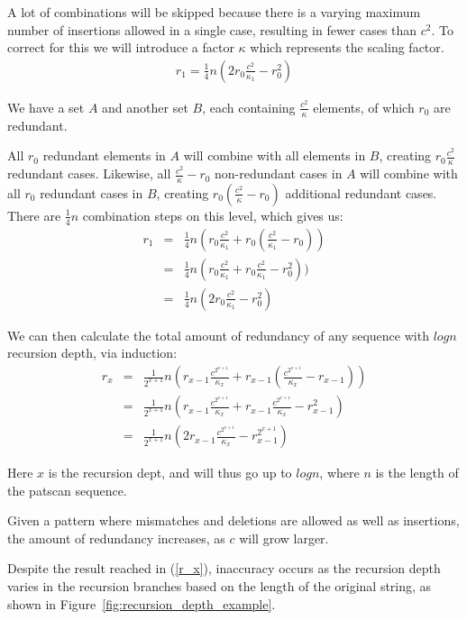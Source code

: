 \documentclass[12pt]{article}
\theoremstyle{definition}
\begin{document}
A lot of combinations will be skipped because there is a varying maximum number of insertions allowed in a single case, resulting in fewer cases than $c^2$. To correct for this we will introduce a factor $\kappa$ which represents the scaling factor.
\begin{eqnarray}
	\label{r_1}
	r_1 = \frac{1}{4}n(2r_0\frac{c^2}{\kappa_1} - r_0^2)
\end{eqnarray}

\begin{example}
We have a set $A$ and another set $B$, each containing $\frac{c^2}{\kappa}$ elements, of which $r_0$ are redundant.

All $r_0$ redundant elements in $A$ will combine with all elements in $B$, creating $r_0\frac{c^2}{\kappa}$ redundant cases. Likewise, all $\frac{c^2}{\kappa}-r_0$ non-redundant cases in $A$ will combine with all $r_0$ redundant cases in $B$, creating $r_0(\frac{c^2}{\kappa}-r_0)$ additional redundant cases. There are $\frac{1}{4}n$ combination steps on this level, which gives us:
\begin{eqnarray}
	r_1 &=& \frac{1}{4}n(r_0\frac{c^2}{\kappa_1} + r_0(\frac{c^2}{\kappa_1} - r_0))\\
		&=& \frac{1}{4}n(r_0\frac{c^2}{\kappa_1} + r_0\frac{c^2}{\kappa_1} - r_0^2))\\
		&=& \frac{1}{4}n(2r_0\frac{c^2}{\kappa_1} - r_0^2)
\end{eqnarray}
\end{example}

We can then calculate the total amount of redundancy of any sequence with $logn$ recursion depth, via induction:
\begin{eqnarray}
	r_x &=& \frac{1}{2^{x+1}}n (r_{x-1}\frac{c^{2^{x+1}}}{\kappa_x} + r_{x-1}(\frac{c^{2^{x+1}}}{\kappa_x} - r_{x-1}))\\
		&=& \frac{1}{2^{x+1}}n (r_{x-1}\frac{c^{2^{x+1}}}{\kappa_x} + r_{x-1}\frac{c^{2^{x+1}}}{\kappa_x} - r_{x-1}^2)\\
		\label{r_x}
		&=& \frac{1}{2^{x+1}}n (2r_{x-1}\frac{c^{2^{x+1}}}{\kappa_x} - r_{x-1}^{2^{x+1}})
\end{eqnarray}

Here $x$ is the recursion dept, and will thus go up to $logn$, where $n$ is the length of the patscan sequence.

Given a pattern where mismatches and deletions are allowed as well as insertions, the amount of redundancy increases, as $c$ will grow larger.

Despite the result reached in (\ref{r_x}), inaccuracy occurs as the recursion depth varies in the recursion branches based on the length of the original string, as shown in Figure~\ref{fig:recursion_depth_example}.
\end{document}
